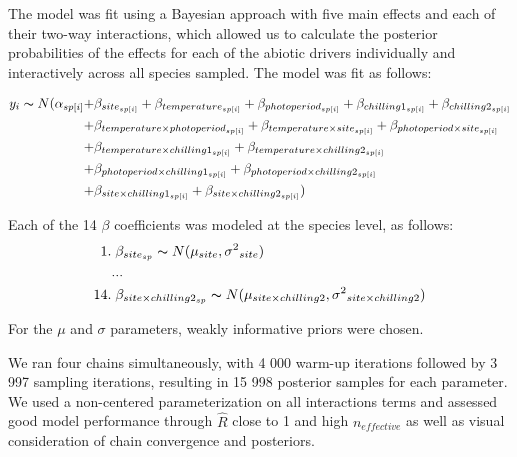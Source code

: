 \documentclass[11pt]{article}
\begin{document}
The model was fit using a Bayesian approach with five main effects and each of their two-way interactions, which allowed us to calculate the posterior probabilities of the effects for each of the abiotic drivers individually and interactively across all species sampled. The model was fit as follows:

\begin{align*}
y_i \thicksim N(\alpha_{sp[i]} +& \beta_{site_{sp[i]}} + \beta_{temperature_{sp[i]}} + \beta_{photoperiod_{sp[i]}} + \beta_{chilling1_{sp[i]}} + \beta_{chilling2_{sp[i]}}  \\
	+& \beta_{temperature \times photoperiod_{sp[i]}} + \beta_{temperature \times site_{sp[i]}} + \beta_{photoperiod \times site_{sp[i]}} \\
	+& \beta_{temperature \times chilling1_{sp[i]}} + \beta_{temperature \times chilling2_{sp[i]}} \\
	+& \beta_{photoperiod \times chilling1_{sp[i]}} + \beta_{photoperiod \times chilling2_{sp[i]}} \\
	+& \beta_{site \times chilling1_{sp[i]}}  + \beta_{site \times chilling2_{sp[i]}} )
\end{align*}

\noindent Each of the 14 $\beta$ coefficients was modeled at the species level, as follows:
\begin{align*}
1.& \; \beta_{site_{sp}} \thicksim N(\mu_{site}, \sigma{^2}_{site}) \\
   &... \\
14.& \; \beta_{site \times chilling2_{sp}} \thicksim N(\mu_{site \times chilling2}, \sigma{^2}_{site \times chilling2})
\end{align*}

\noindent For the $\mu$ and $\sigma$ parameters, weakly informative priors were chosen.

We ran four chains simultaneously, with 4 000 warm-up iterations followed by 3 997 sampling iterations, resulting in 15 998 posterior samples for each parameter. We used a non-centered parameterization on all interactions terms and assessed good model performance through $\hat{R}$ close to 1 and high $n_{effective}$ as well as visual consideration of chain convergence and posteriors. 

\end{document}
